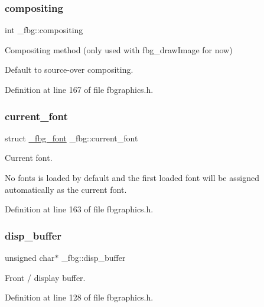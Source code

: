 \subsubsection{\texorpdfstring{compositing}{compositing}}
{\footnotesize\ttfamily int \+\_\+fbg\+::compositing}



Compositing method (only used with fbg\+\_\+draw\+Image for now) 

Default to source-\/over compositing. 

Definition at line 167 of file fbgraphics.\+h.

\mbox{\label{struct__fbg_a72868d703236aaabb7a5031703a6bbd8}} 
\subsubsection{\texorpdfstring{current\+\_\+font}{current\_font}}
{\footnotesize\ttfamily struct \hyperlink{fbgraphics_8h_struct__fbg__font}{\+\_\+fbg\+\_\+font} \+\_\+fbg\+::current\+\_\+font}



Current font. 

No fonts is loaded by default and the first loaded font will be assigned automatically as the current font. 

Definition at line 163 of file fbgraphics.\+h.

\mbox{\label{struct__fbg_aa20614c94c7235bc5bc105b6e71e1be8}} 
\subsubsection{\texorpdfstring{disp\+\_\+buffer}{disp\_buffer}}
{\footnotesize\ttfamily unsigned char$\ast$ \+\_\+fbg\+::disp\+\_\+buffer}



Front / display buffer. 



Definition at line 128 of file fbgraphics.\+h.

\mbox{\label{struct__fbg_ad3cac82bd9448a4020a4e08621f5269a}} 
